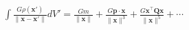 \documentclass[preview]{standalone}
\begin{document}
\begin{align*}
\int\frac{G\rho(\mathbf x')}{\|\mathbf x-\mathbf x'\|} dV' = \frac{Gm}{\|\mathbf x\|} + \frac{G\mathbf p\cdot\mathbf x}{\|\mathbf x\|^3} + \frac{G\mathbf x^\top\mathbf Q\mathbf x}{\|\mathbf x\|^5} +\cdots
\end{align*}
\end{document}
